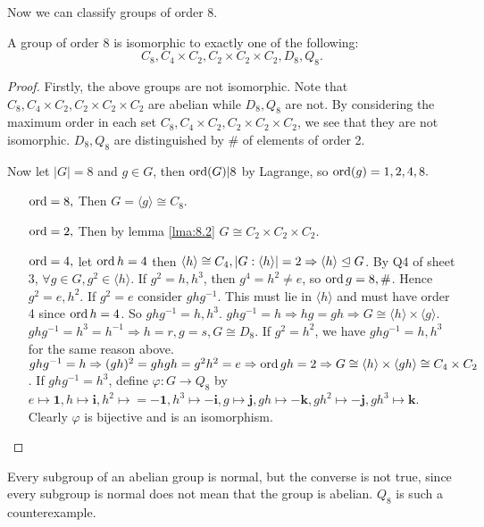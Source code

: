 \documentclass[a4paper]{article}
\begin{document}
Now we can classify groups of order 8.
\begin{theorem}\label{thm:8.3}
  A group of order 8 is isomorphic to exactly one of the following:
  \[
    C_8, C_4 \times C_2,C_2 \times C_2 \times C_2, D_8, Q_8.
  \]
\end{theorem}
\begin{proof}
  Firstly, the above groups are not isomorphic. Note that $  C_8, C_4
  \times C_2,C_2 \times C_2 \times C_2$ are abelian while $D_8, Q_8$
  are not. By considering the maximum order in each set $ C_8, C_4
  \times C_2,C_2 \times C_2 \times C_2 $, we see that they are not
  isomorphic. $D_8, Q_8$ are distinguished by \# of elements of order 2.

  Now let $ |G|=8 $ and $g\in G$, then $ \operatorname{ord}(G)|8 $ by Lagrange, so
  $ \operatorname{ord}(g)=1,2,4,8. $
  \begin{enumerate}[align=left]
    \item[$ \operatorname{ord}=8 ,$] Then $ G=\langle g \rangle \cong C_8 $.
    \item[$ \operatorname{ord}=2 ,$] Then by lemma \ref{lma:8.2} $ G \cong
      C_2\times C_2 \times C_2 $.
    \item[$ \operatorname{ord}=4, $] let $\operatorname{ord} h=4$ then $ \langle h \rangle \cong
      C_4, |G:\langle h \rangle |=2 \Rightarrow \langle h \rangle
      \trianglelefteq G $. By Q4 of sheet 3, $ \forall g\in G, g^2\in
      \langle h \rangle $. If $ g^2=h,h^3 $, then $ g^4=h^2\neq e $,
      so $ \operatorname{ord} g=8,\# $. Hence $g^2=e,h^2$. If $g^2=e$ consider $
      ghg^{-1} $. This must lie in $ \langle h \rangle $ and must
      have order 4 since $\operatorname{ord} h=4$. So $ ghg^{-1}=h,h^3 $. $
      ghg^{-1}=h \Rightarrow hg=gh \Rightarrow G \cong \langle h
      \rangle \times \langle g \rangle $. $ ghg^{-1}=h^3=h^{-1}
      \Rightarrow h=r,g=s, G \cong D_8 $. If $g^2=h^2$, we have $
      ghg^{-1}=h,h^3 $ for the same reason above. $ ghg^{-1}=h
      \Rightarrow (gh)^2=ghgh=g^2h^2=e \Rightarrow \operatorname{ord} gh=2
      \Rightarrow G \cong \langle h \rangle \times \langle gh \rangle
      \cong C_4 \times C_2 $. If $ ghg^{-1}=h^3  $, define $ \varphi:
      G\to Q_8 $ by $ e \mapsto \mathbf{1}, h \mapsto \mathbf{i},h^2
      \mapsto =-\mathbf{1}, h^3 \mapsto - \mathbf{i}, g \mapsto
      \mathbf{j},gh \mapsto - \mathbf{k}, gh^2 \mapsto -\mathbf{j},
      gh^3 \mapsto \mathbf{k} $. Clearly $\varphi$ is bijective and
      is an isomorphism.
  \end{enumerate}
\end{proof}
\begin{remark}
  Every subgroup of an abelian group is normal, but the converse is
  not true, since every subgroup is normal does not mean that the
  group is abelian. $ Q_8 $ is such a counterexample.
\end{remark}
\end{document}
